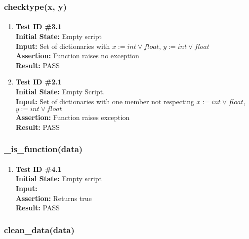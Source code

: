 \documentclass[12pt, titlepage]{article}
\begin{document}
\subsubsection{checktype(x, y)}		
	\label{sec:4.0.3}
	\paragraph{}
		\begin{enumerate}
			\item{\textbf{Test ID \#3.1\\}}
			\textbf{Initial State:} Empty script\\
			\textbf{Input:} Set of dictionaries with $x:= int \vee float$, $y:= int \vee float$ \\
			\textbf{Assertion:} Function raises no exception \\
			\textbf{Result:} PASS
			
			\item{\textbf{Test ID \#2.1\\}}
			\textbf{Initial State:} Empty Script.\\
			\textbf{Input:} Set of dictionaries with one member not respecting $x:= int \vee float$, $y:= int \vee float$ \\
			\textbf{Assertion:} Function raises exception \\
			\textbf{Result:} PASS
		\end{enumerate}
		
\subsubsection{\_is\_function(data)}		
	\label{sec:4.0.4}
	\paragraph{}
		\begin{enumerate}
			\item{\textbf{Test ID \#4.1\\}}
			\textbf{Initial State:} Empty script\\
			\textbf{Input:}  \\
			\textbf{Assertion:} Returns true \\
			\textbf{Result:} PASS
			

		\end{enumerate}		
		

\subsubsection{clean\_data(data)}		
	\label{sec:4.0.5}
\end{document}
